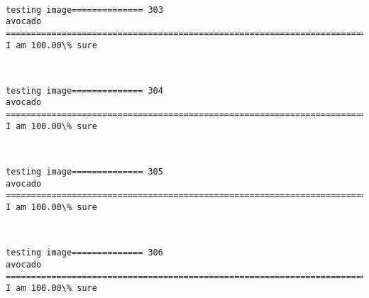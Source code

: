 \documentclass[11pt]{article}
\begin{document}
    \begin{center}
    \end{center}
    { \hspace*{\fill} \\}
    
    \begin{Verbatim}[commandchars=\\\{\}]
testing image============== 303
avocado
============================================================================
I am 100.00\% sure

    \end{Verbatim}

    \begin{center}
    \end{center}
    { \hspace*{\fill} \\}
    
    \begin{Verbatim}[commandchars=\\\{\}]
testing image============== 304
avocado
============================================================================
I am 100.00\% sure

    \end{Verbatim}

    \begin{center}
    \end{center}
    { \hspace*{\fill} \\}
    
    \begin{Verbatim}[commandchars=\\\{\}]
testing image============== 305
avocado
============================================================================
I am 100.00\% sure

    \end{Verbatim}

    \begin{center}
    \end{center}
    { \hspace*{\fill} \\}
    
    \begin{Verbatim}[commandchars=\\\{\}]
testing image============== 306
avocado
============================================================================
I am 100.00\% sure

    \end{Verbatim}
\end{document}
